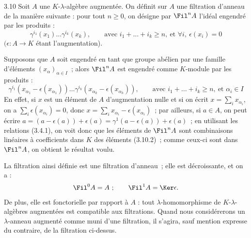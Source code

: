 
3.10
Soit \(A\) une \(K\)-\(\lambda\)-algèbre augmentée. On définit sur \(A\) une filtration d'anneau de la manière suivante : pour tout \(n\ge0\), on désigne par \(\Fil^n A\) l'idéal engendré par les produits :
\begin{equation}\tag{3.10.1}
  \gamma^{i_1}(x_1)\ldots\gamma^{i_k}(x_k),
  \qquad \text{avec } i_1+\ldots+i_k\ge n,\ \text{et } \forall i,\ \epsilon(x_i)=0
\end{equation}
\((\epsilon:A\to K\) étant l'augmentation).

Supposons que \(A\) soit engendré en tant que groupe abélien par une famille d'éléments \((x_\alpha)_{\alpha\in I}\)~; alors \(\Fil^n A\) est engendré comme \(K\)-module par les produits :
\begin{equation}\tag{3.10.2}
  \gamma^{i_1}(x_{\alpha_1}-\epsilon(x_{\alpha_1}))\ldots
  \gamma^{i_k}(x_{\alpha_k}-\epsilon(x_{\alpha_k})),
  \qquad \text{avec } i_1+\ldots+i_k\ge n,\ \text{et } \alpha_i\in I
\end{equation}
En effet, si \(x\) est un élément de \(A\) d'augmentation nulle et si on écrit \(x=\sum_i x_{\alpha_i}\), on a \(\sum_i \epsilon(x_{\alpha_i})=0\), donc \(x=\sum_i x_{\alpha_i}-\epsilon(x_{\alpha_i})\)~; par ailleurs, si \(a\in A\), on peut écrire \(a=(a-\epsilon(a))+\epsilon(a)=\gamma^1(a-\epsilon(a))+\epsilon(a)\)~; en utilisant les relations (3.4.1), on voit donc que les éléments de \(\Fil^n A\) sont combinaisons linéaires à coefficients dans \(K\) des éléments (3.10.2)~; comme ceux-ci sont dans \(\Fil^n A\), on obtient le résultat voulu.

La filtration ainsi définie est une filtration d'anneau~; elle est décroissante, et on a :
\[
  \Fil^0A=A~;
  \qquad \Fil^1A=\Ker\epsilon.
\]
De plus, elle est fonctorielle par rapport à \(A\) : tout \(\lambda\)-homomorphisme de \(K\)-\(\lambda\)-algèbres augmentées est compatible aux filtrations. Quand nous considérerons un \(\lambda\)-anneau augmenté comme muni d'une filtration, il s'agira, sauf mention expresse du contraire, de la filtration ci-dessus.

